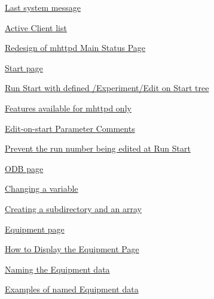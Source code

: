 \begin{TabularC}{2}
\begin{TabularC}{2}
\begin{DoxyItemize}
\begin{DoxyItemize}
\begin{DoxyItemize}
\begin{DoxyItemize}
\begin{DoxyItemize}
\item \hyperlink{RC_mhttpd_status_page_features_RC_mhttpd_status_latest_msg}{Last system message} 
\item \hyperlink{RC_mhttpd_status_page_features_RC_mhttpd_status_clients}{Active Client list} 
\end{DoxyItemize}
\item \hyperlink{RC_mhttpd_status_page_redesign}{Redesign of mhttpd Main Status Page} 
\end{DoxyItemize}
\item \hyperlink{RC_mhttpd_Start_page}{Start page} 
\begin{DoxyItemize}
\item \hyperlink{RC_mhttpd_Start_page_RC_mhttpd_Edit_On_Start}{Run Start with defined /Experiment/Edit on Start tree} 
\begin{DoxyItemize}
\item \hyperlink{RC_mhttpd_Start_page_RC_EOS_web_features}{Features available for mhttpd only} 
\item \hyperlink{RC_mhttpd_Start_page_RC_Edit_PC}{Edit-\/on-\/start Parameter Comments} 
\item \hyperlink{RC_mhttpd_Start_page_RC_Prevent_Edit_RN}{Prevent the run number being edited at Run Start} 
\end{DoxyItemize}
\end{DoxyItemize}
\item \hyperlink{RC_mhttpd_ODB_page}{ODB page} 
\begin{DoxyItemize}
\item \hyperlink{RC_mhttpd_ODB_page_RC_mhttpd_ODB_page_example1}{Changing a variable} 
\item \hyperlink{RC_mhttpd_ODB_page_RC_mhttpd_ODB_page_example2}{Creating a subdirectory and an array} 
\end{DoxyItemize}
\item \hyperlink{RC_mhttpd_Equipment_page}{Equipment page} 
\begin{DoxyItemize}
\item \hyperlink{RC_mhttpd_Equipment_page_RC_mhttpd_Equipment_var}{How to Display the Equipment Page} 
\item \hyperlink{RC_mhttpd_Equipment_page_RC_mhttpd_Equipment_Naming}{Naming the Equipment data} 
\begin{DoxyItemize}
\item \hyperlink{RC_mhttpd_Equipment_page_RC_mhttpd_Equipment_Examples}{Examples of named Equipment data} 
\begin{DoxyItemize}

\end{DoxyItemize}
\end{DoxyItemize}
\end{DoxyItemize}
\end{DoxyItemize}
\end{DoxyItemize}
\end{DoxyItemize}
\end{TabularC}
\end{TabularC}
